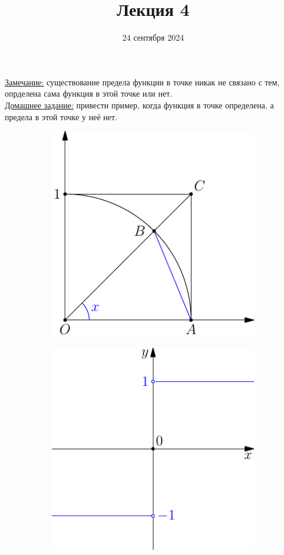 \documentclass{article}
\title{Лекция 4}
\author{}
\date{24 сентября 2024}
\begin{document}
    \maketitle
    \noindent
    \underline{Замечание:} существование предела функции в точке никак не связано с тем, опрделена сама функция в этой точке или нет.\\
    \underline{Домашнее задание:} привести пример, когда функция в точке определена, а предела в этой точке у неё нет.    
    \begin{figure}[h]
        \begin{subfigure}[t]{0.3\textwidth}
            \includegraphics{4-1.pdf}
            \caption{}
        \end{subfigure}
        \hfill
        \begin{subfigure}[t]{0.3\textwidth}
            \includegraphics{4-2.pdf}

\end{subfigure}
\end{figure}
\end{document}
